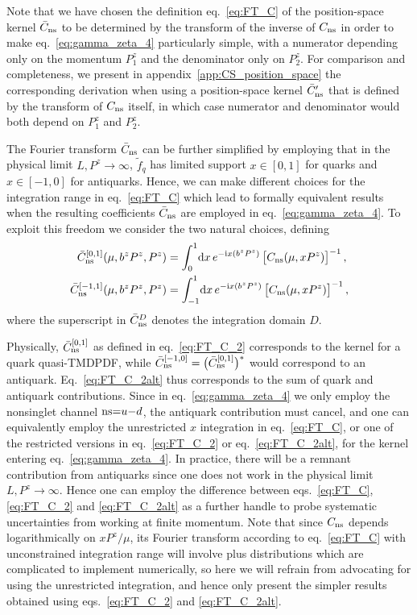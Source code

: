 \documentclass[11pt,a4paper]{article}
\DeclareRobustCommand{\Eq}[1]{Eq.~\eqref{eq:#1}}
\DeclareRobustCommand{\eq}[1]{eq.~\eqref{eq:#1}}
\DeclareRobustCommand{\eqs}[2]{eqs.~\eqref{eq:#1} and \eqref{eq:#2}}
\DeclareRobustCommand{\eqss}[3]{eqs.~\eqref{eq:#1}, \eqref{eq:#2} and \eqref{eq:#3}}
\DeclareRobustCommand{\app}[1]{appendix~\ref{app:#1}}
\newcommand{\df}{\mathrm{d}}
\newcommand{\img}{\mathrm{i}}
\newcommand{\ns}{{\rm ns}}
\begin{document}
Note that we have chosen the definition \eq{FT_C} of the position-space kernel $\bar C_\ns$ to be determined by the transform of the inverse of $C_\ns$ in order to make \eq{gamma_zeta_4} particularly simple, with a numerator depending only on the momentum $P^z_1$ and the denominator only on $P^z_2$.
For comparison and completeness, we present in \app{CS_position_space} the corresponding derivation when using a position-space kernel $\bar C_\ns^\prime$ that is defined by the transform of $C_\ns$ itself, in which case numerator and denominator would both depend on $P^z_1$ and $P^z_2$.

The Fourier transform $\bar C_\ns$ can be further simplified by employing that in the physical limit $L, P^z \to\infty$, $\tilde f_q$ has limited support $x \in [0,1]$ for quarks and $x \in [-1,0]$ for antiquarks.
Hence, we can make different choices for the integration range in \eq{FT_C} which lead to formally equivalent results when the resulting coefficients $\bar C_{\rm ns}$ are employed in \eq{gamma_zeta_4}.
To exploit this freedom we consider the two natural choices, defining
\begin{align} \label{eq:FT_C_2}
 \bar C_\ns^{[0,1]}(\mu, b^z P^z, P^z) &= \int_0^1\!\df x \, e^{-\img x (b^z P^z)} \, \bigl[ C_\ns(\mu, x P^z)\bigr]^{-1}
\,,\\ \label{eq:FT_C_2alt}
 \bar C_\ns^{[-1,1]}(\mu, b^z P^z, P^z) &= \int_{-1}^1\!\df x \, e^{-\img x (b^z P^z)} \, \bigl[ C_\ns(\mu, x P^z)\bigr]^{-1}
\,,\end{align}
where the superscript in $\bar C_\ns^D$ denotes the integration domain $D$.

Physically, $\bar C_\ns^{[0,1]}$ as defined in \eq{FT_C_2} corresponds to the kernel for a quark quasi-TMDPDF,
while $\bar C_\ns^{[-1,0]} = \bigl(\bar C_\ns^{[0,1]}\bigr)^*$ would correspond to an antiquark.
\Eq{FT_C_2alt} thus corresponds to the sum of quark and antiquark contributions.
Since in \eq{gamma_zeta_4} we only employ the nonsinglet channel $\ns{=}u{-}d$, the antiquark contribution must cancel, and one can equivalently employ the unrestricted $x$ integration in \eq{FT_C}, or one of the restricted versions in \eq{FT_C_2} or \eq{FT_C_2alt}, for the kernel entering \eq{gamma_zeta_4}.
In practice, there will be a remnant contribution from antiquarks since one does not work in the physical limit $L, P^z \to\infty$. Hence one can employ the difference between \eqss{FT_C}{FT_C_2}{FT_C_2alt} as a further handle to probe systematic uncertainties from working at finite momentum.
Note that since $C_\ns$ depends logarithmically on $x P^z / \mu$, its Fourier transform according to \eq{FT_C} with unconstrained integration range will involve plus distributions which are complicated to implement numerically, so here we will refrain from advocating for using the unrestricted integration, and hence only present the simpler results obtained using \eqs{FT_C_2}{FT_C_2alt}.
\end{document}
